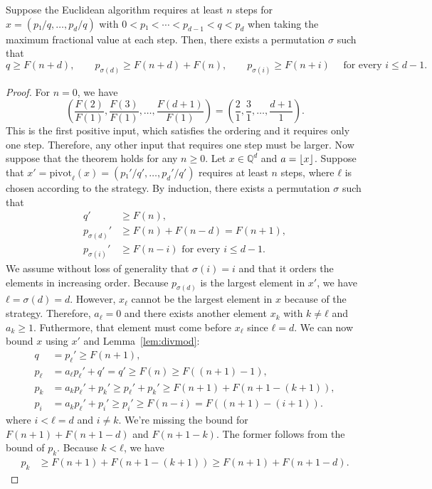 \iffalse

\begin{theorem}
  Suppose the Euclidean algorithm requires at least $n$ steps for $x = (p₁/q, …, p_d/q)$
  with $0 < p₁ < ⋯ < p_{d-1} < q < p_d$ when taking the maximum fractional value at each step.
  Then, there exists a permutation $σ$ such that
  \[
    q ≥ F(n+d),
    \qquad
    p_{σ(d)} ≥ F(n + d) + F(n),
    \qquad
    p_{σ(i)} ≥ F(n + i)
    \quad
    \text{ for every } i ≤ d - 1.
  \]
\end{theorem}

\begin{proof}
  For $n = 0$, we have
  \[
    \left(\frac{F(2)}{F(1)}, \frac{F(3)}{F(1)}, …, \frac{F(d+1)}{F(1)} \right)
    = \left(\frac{2}{1}, \frac{3}{1}, …, \frac{d+1}{1} \right).
  \]
  This is the first positive input, which satisfies the ordering and it requires only one step.
  Therefore, any other input that requires one step must be larger.
  Now suppose that the theorem holds for any $n ≥ 0$.
  Let $x ∈ ℚ^d$ and $a = \left\lfloor x\right\rfloor$.
  Suppose that $x' = \mathrm{pivot}_ℓ(x) = (p₁'/q', …, p_d'/q')$ requires at
  least $n$ steps, where $ℓ$ is chosen according to the strategy.
  By induction, there exists a permutation $σ$ such that
  \begin{align*}
    q'        & ≥ F(n),                     \\
    p_{σ(d)}' & ≥ F(n) + F(n - d) = F(n+1), \\
    p_{σ(i)}' & ≥ F(n - i)
    \text{ for every } i ≤ d - 1.
  \end{align*}
  We assume without loss of generality that $σ(i) = i$ and that it orders the elements in increasing order.
  Because $p_{σ(d)}$ is the largest element in $x'$, we have $ℓ = σ(d) = d$.
  However, $x_ℓ$ cannot be the largest element in $x$ because of the strategy.
  Therefore, $a_ℓ = 0$ and there exists another element $x_k$ with $k ≠ ℓ$ and $a_k ≥ 1$.
  Futhermore, that element must come before $x_ℓ$ since $ℓ = d$.
  We can now bound $x$ using $x'$ and Lemma~\ref{lem:divmod}:
  \begin{align*}
    q   & = p_ℓ' ≥ F(n+1), \\
    p_ℓ & = a_ℓ p_ℓ' + q' = q' ≥ F(n) ≥ F((n+1) - 1), \\
    p_k & = a_k p_ℓ' + p_k' ≥ p_ℓ' + p_k' ≥ F(n + 1) + F(n + 1 - (k + 1)), \\
    p_i & = a_k p_ℓ' + p_i' ≥ p_i' ≥ F(n - i) = F((n+1) - (i+1)).
  \end{align*}
  where $i < ℓ = d$ and $i ≠ k$.
  We're missing the bound for $F(n+1) + F(n+1 - d)$ and $F(n + 1 - k)$.
  The former follows from the bound of $p_k$.
  Because $k < ℓ$, we have
  \begin{align*}
    p_k & ≥ F(n + 1) + F(n + 1 - (k + 1)) ≥ F(n+1) + F(n+1 - d).
  \end{align*}
\end{proof}


